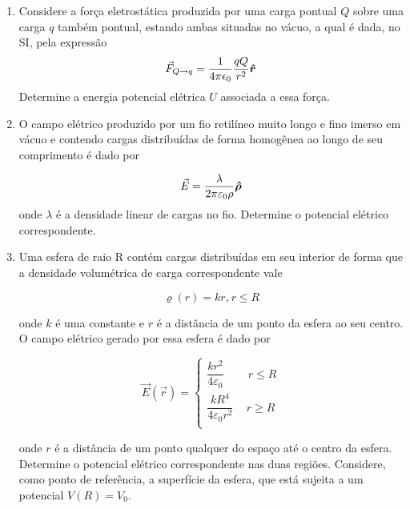 \documentclass[11pt,a4paper]{article}
\newcommand{\mat}[1]{\mbox{\boldmath{$#1$}}}
\begin{document}
\begin{enumerate}
\item Considere a força eletrostática produzida por uma carga pontual $Q$ sobre uma carga $q$ também pontual, estando ambas situadas no vácuo, a qual é dada, no SI, pela expressão
$$\vec{F}_{Q \to q} = \displaystyle\dfrac{1}{4\pi \epsilon_0}\displaystyle\dfrac{qQ}{r^2}\mat{\hat{r}}$$
Determine a energia potencial elétrica $U$ associada a essa força.

\item O campo elétrico produzido por um fio retilíneo muito longo e fino imerso em vácuo e contendo cargas distribuídas de forma homogênea ao longo de seu comprimento é dado por

$$\vec{E} = \displaystyle\dfrac{\lambda}{2\pi \varepsilon_0 \rho}\mat{\hat{\rho}}$$
onde $\lambda$ é a densidade linear de cargas no fio. Determine o potencial elétrico correspondente.

\item Uma esfera de raio R contém cargas distribuídas em seu interior de forma que a densidade volumétrica de carga correspondente vale

$$\varrho(r) = kr \textrm{,}\ r \leq R$$

onde $k$ é uma constante e $r$ é a distância de um ponto da esfera ao seu centro. O campo elétrico gerado por essa esfera é dado por

$$\vec{E}(\vec{r}) = 
		\begin{cases}
			\displaystyle\dfrac{kr^2}{4\varepsilon_0}\, \quad\quad r \leq R \\
			\displaystyle\dfrac{kR^4}{4\varepsilon_0 r^2}\, \quad r \geq R \\
		\end{cases}
	$$
	
onde $r$ é a distância de um ponto qualquer do espaço até o centro da esfera. Determine o potencial elétrico correspondente nas duas regiões. Considere, como ponto de referência, a superfície da esfera, que está sujeita a um potencial $V(R) = V_0$.
 
\end{enumerate}		
	
\end{document}
